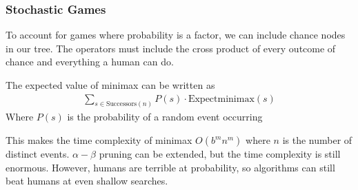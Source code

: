 \documentclass{chezarticle}
\begin{document}
\subsubsection{Stochastic Games}
To account for games where probability is a factor, we can include chance nodes in our tree. The operators must include the cross product of every outcome of chance and everything a human can do.
\begin{definition}
The expected value of minimax can be written as
\begin{align*}
    \sum_{s \in \text{Successors}(n)} P(s) \cdot \text{Expectminimax}(s)
\end{align*}
Where $P(s)$ is the probability of a random event occurring
\end{definition}
This makes the time complexity of minimax $O(b^m n^m)$ where $n$ is the number of distinct events. $\alpha - \beta$ pruning can be extended, but the time complexity is still enormous. However, humans are terrible at probability, so algorithms can still beat humans at even shallow searches.
\end{document}
